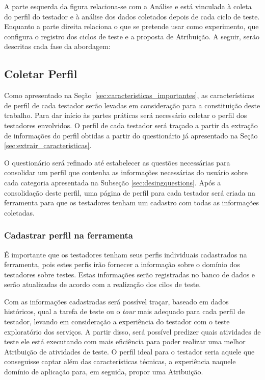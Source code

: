 A parte esquerda da figura relaciona-se com a Análise e está vinculada à coleta do perfil do testador e à análise dos dados coletados depois de cada ciclo de teste. Enquanto a parte direita relaciona o que se pretende usar como experimento, que configura o registro dos ciclos de teste e a proposta de Atribuição. A seguir, serão descritas cada fase da abordagem:

\subsection{Coletar Perfil}


Como apresentado na Seção~\ref{sec:caracteristicas_importantes}, as características de perfil de cada testador serão levadas em consideração para a constituição deste trabalho. Para dar início às partes práticas será necessário coletar o perfil dos testadores envolvidos. O perfil de cada testador será traçado a partir da extração de informações do perfil obtidas a partir do questionário já apresentado na Seção \ref{sec:extrair_caracteristicas}.

O questionário será refinado até estabelecer as questões necessárias para consolidar um perfil que contenha as informações necessárias do usuário sobre cada categoria apresentada na Subseção \ref{sec:desingquestions}. Após a consolidação deste perfil, uma página de perfil para cada testador será criada na ferramenta \itractool para que os testadores tenham um cadastro com todas as informações coletadas.

\subsubsection{Cadastrar perfil na ferramenta \itractool}

É importante que os testadores tenham seus perfis individuais cadastrados na ferramenta, pois estes perfis irão fornecer a informação sobre o domínio dos testadores sobre testes. Estas informações serão registradas no banco de dados e serão atualizadas de acordo com a realização dos cilos de teste.

Com as informações cadastradas será possível traçar, baseado em dados históricos, qual a tarefa de teste ou o \textit{tour} mais adequado para cada perfil de testador, levando em consideração a experiência do testador com o teste exploratório dos serviços. A partir disso, será possível predizer quais atividades de teste ele está executando com mais eficiência para poder realizar uma melhor Atribuição de atividades de teste. O perfil ideal para o testador seria aquele que conseguisse captar além das características técnicas, a experiência naquele domínio de aplicação para, em seguida, propor uma Atribuição.

